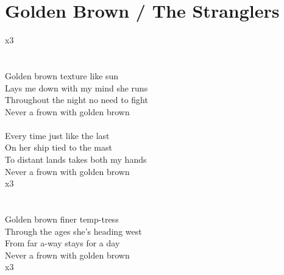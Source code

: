 \section{Golden Brown / The Stranglers}\label{ch:goldenbrown}
\Aminor
\Cmajor
\Dminor
\Eminor
\Fmajor
\Gmajor

          x3\\
      \\
      \\
 Golden  brown  texture like  sun\\
 Lays me  down  with my mind  she runs\\
 Throughout the  night  no need to  fight\\
 Never a  frown  with golden  brown\\
         \\
 Every  time  just like the  last\\
 On her  ship  tied to the  mast\\
 To distant  lands  takes both my  hands\\
 Never a  frown  with golden  brown\\
          x3\\
      \\
      \\
 Golden  brown  finer temp-tress\\
 Through the  ages  she's heading  west\\
 From far a-way  stays for a  day\\
 Never a  frown  with golden  brown\\
          x3\\
      \\
